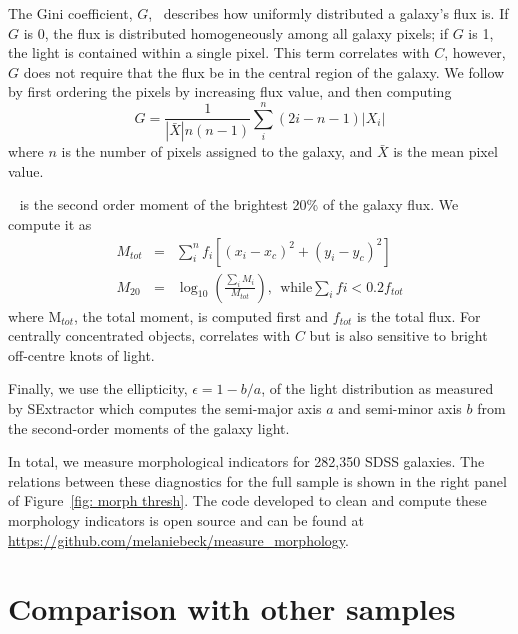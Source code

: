 The Gini coefficient, $G$,~\citep{Glasser1962, Abraham2003} describes how uniformly distributed a galaxy's flux is.  If $G$ is 0, the flux is distributed homogeneously among all galaxy pixels; if $G$ is 1,  the light is contained within a single pixel. This term correlates with $C$, however, $G$ does not require that the flux be in the central region of the galaxy.  We follow~\cite{Lotz2004} by first ordering the pixels by increasing flux value, and then computing
\begin{equation}
G = \frac{1}{|\bar X|n(n-1)}\sum_i^n(2i-n-1)|X_i|
\end{equation}
where $n$ is the number of pixels assigned to the galaxy, and $\bar X$ is the mean pixel value. 

~\citep{Lotz2004} is the second order moment of the brightest 20\% of the galaxy flux. We compute it as
\begin{eqnarray}
 M_{tot} & = & \sum_i^nf_i[(x_i-x_c)^2 + (y_i-y_c)^2]  \\
 M_{20} & = & \log_{10} (\frac{\sum_iM_i}{M_{tot}}), ~~\textrm{while} \sum_ifi < 0.2f_{tot}
\end{eqnarray}
where M$_{tot}$, the total moment, is computed first and $f_{tot}$ is the total flux. For centrally concentrated objects,  correlates with $C$ but is also sensitive to bright off-centre knots of light. 

Finally, we use the ellipticity, $\epsilon = 1 - b/a$, of the light distribution as measured by SExtractor which computes the semi-major axis $a$ and semi-minor axis $b$ from the second-order moments of the galaxy light.  

In total, we measure morphological indicators for 282,350 SDSS galaxies. The relations between these diagnostics for the full sample is shown in the right panel of Figure~\ref{fig: morph thresh}. The code developed to clean and compute these morphology indicators is open source and can be found at \url{https://github.com/melaniebeck/measure_morphology}.



\section{Comparison with other samples}